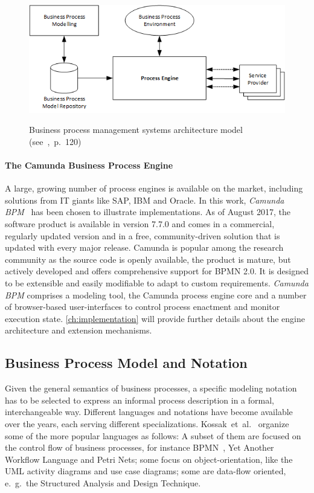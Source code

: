 \begin{figure}[]
	\myfloatalign
	{\includegraphics[width=1\linewidth]{chapters/background/bpm-architecture.png}}
	\caption{Business process management systems architecture model (see~\cite{weske:bpm-book},~p.~120)}
	\label{fig:bpm-architecture}
\end{figure}


\paragraph{The Camunda Business Process Engine}
A large, growing number of process engines is available on the market, including solutions from IT giants like SAP, IBM and Oracle.
In this work, \emph{Camunda BPM}~\cite{camunda} has been chosen to illustrate implementations.
As of August 2017, the software product is available in version 7.7.0 and comes in a commercial, regularly updated version and in a free, community-driven solution that is updated with every major release.
Camunda is popular among the research community as the source code is openly available, the product is mature, but actively developed and offers comprehensive support for BPMN 2.0. It is designed to be extensible and easily modifiable to adapt to custom requirements.
\emph{Camunda BPM} comprises a modeling tool, the Camunda process engine core and a number of browser-based user-interfaces to control process enactment and monitor execution state.
\autoref{ch:implementation} will provide further details about the engine architecture and extension mechanisms.


\subsection{Business Process Model and Notation}
Given the general semantics of business processes, a specific modeling notation has to be selected to express an informal process description in a formal, interchangeable way.
Different languages and notations have become available over the years, each serving different specializations.
Kossak~et~al.~\cite{kossak:bpmn2} organize some of the more popular languages as follows: A subset of them are focused on the control flow of business processes, for instance \ac{BPMN}~\cite{bpmnspec}, Yet Another Workflow Language and Petri Nets; some focus on object-orientation, like the \ac{UML} activity diagrams and use case diagrams; some are data-flow oriented, e.~g.~the Structured Analysis and Design Technique.

